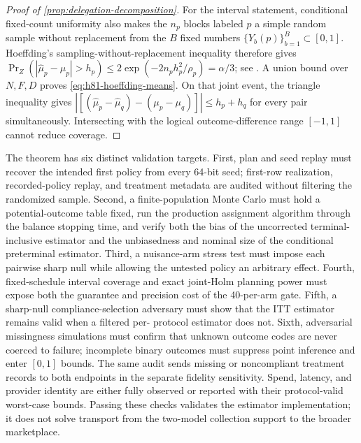 \documentclass[11pt]{article}
\newcommand{\1}{\mathbf{1}}
\begin{document}
\begin{proof}[Proof of \cref{prop:delegation-decomposition}]
For the interval statement, conditional fixed-count uniformity also makes the
$n_p$ blocks labeled $p$ a simple random sample without replacement from the
$B$ fixed numbers $\{Y_b(p)\}_{b=1}^B\subset[0,1]$.  Hoeffding's
sampling-without-replacement inequality therefore gives
$\Pr_Z(|\widehat\mu_p-\mu_p|>h_p)\le
2\exp(-2n_ph_p^2/\rho_p)=\alpha/3$; see
\citet{hoeffding1963,serfling1974}.  A union bound over $N,F,D$ proves
\cref{eq:h81-hoeffding-means}.  On that joint event, the triangle inequality
gives
$|[(\widehat\mu_p-\widehat\mu_q)-(\mu_p-\mu_q)]|\le h_p+h_q$
for every pair simultaneously.  Intersecting with the logical outcome-difference
range $[-1,1]$ cannot reduce coverage.
\end{proof}

The theorem has six distinct validation targets.  First, plan and seed replay
must recover the intended first policy from every 64-bit seed; first-row
realization, recorded-policy replay, and treatment metadata are audited without
filtering the randomized sample.  Second,
a finite-population Monte Carlo must hold a potential-outcome table fixed, run
the production assignment algorithm through the balance stopping time, and
verify both the bias of the uncorrected terminal-inclusive estimator and the
unbiasedness and nominal size of the conditional preterminal estimator.  Third,
a nuisance-arm stress test must impose each pairwise sharp null while allowing
the untested policy an arbitrary effect.  Fourth, fixed-schedule interval
coverage and exact joint-Holm planning power must expose both the guarantee and
precision cost of the 40-per-arm gate.  Fifth, a sharp-null compliance-selection
adversary must show that the ITT estimator remains valid when a filtered per-
protocol estimator does not.  Sixth, adversarial missingness simulations must
confirm that unknown outcome codes are never coerced to failure; incomplete
binary outcomes must suppress point inference and enter $[0,1]$ bounds.  The
same audit sends missing or noncompliant treatment records to both endpoints in
the separate fidelity sensitivity.  Spend, latency,
and provider identity are either fully observed or reported with their
protocol-valid worst-case bounds.  Passing these checks validates the estimator
implementation; it does not solve transport from the two-model collection
support to the broader marketplace.
\end{document}
